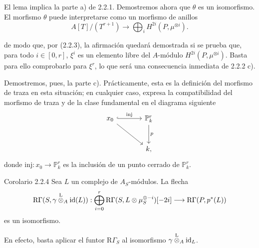 El lema implica la parte a) de 2.2.1. Demostremos ahora que $\theta$ es un isomorfismo. El morfismo $\theta$ puede interpretarse como un morfismo de anillos
\[
A[T]/(T^{r+1})\longrightarrow\bigoplus_i H^{2i}(P,\mu^{\otimes i}).
\]


de modo que, por (2.2.3), la afirmación quedará demostrada si se prueba que, para todo $i\in[0,r]$, $\xi^i$ es un elemento libre del $A$-módulo $H^{2i}(P,\mu^{\otimes i})$. Basta para ello comprobarlo para $\xi^r$, lo que será una consecuencia inmediata de 2.2.2 c).

Demostremos, pues, la parte c). Prácticamente, esta es la definición del morfismo de traza en esta situación; en cualquier caso, expresa la compatibilidad del morfismo de traza y de la clase fundamental en el diagrama siguiente
\[
\begin{tikzcd}[column sep=large,row sep=large]
x_0 \arrow[r,hook,"\mathrm{inj}"] \arrow[dr] & \mathbb P^r_k \arrow[d,"p"]\\
& k ,
\end{tikzcd}
\]
donde $\mathrm{inj}:x_0\to \mathbb P^r_k$ es la inclusión de un punto cerrado de $\mathbb P^r_k$.

\begin{statement}{Corolario 2.2.4}
Sea $L$ un complejo de $A_S$-módulos. La flecha
\[
\mathrm R\Gamma(S,\gamma\overset{\mathrm L}{\otimes}_A\mathrm{id}(L)):
\bigoplus_{i=0}^r \mathrm R\Gamma(S,L\otimes\mu_S^{\otimes -i})[-2i]
\longrightarrow
\mathrm R\Gamma(P,p^*(L))
\]
es un isomorfismo.
\end{statement}

En efecto, basta aplicar el funtor $\mathrm R\Gamma_S$ al isomorfismo $\gamma\overset{\mathrm L}{\otimes}_A\mathrm{id}_L$.
